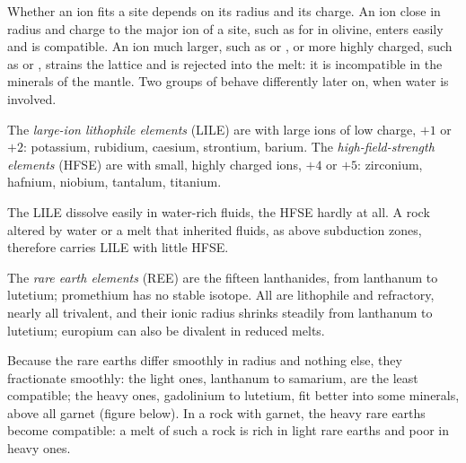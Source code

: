 Whether an ion fits a site depends on its radius and its charge. An ion close in
radius and charge to the major ion of a site, such as  for  in
olivine, enters easily and is compatible. An ion much larger, such as
 or , or more highly charged, such as  or
, strains the lattice and is rejected into the melt: it is
incompatible in the minerals of the mantle. Two groups of 
behave differently later on, when water is involved.

\begin{definition}
\label{def:b2:elements-in-the-earth:lile-hfse}
The \emph{large-ion lithophile elements}
(LILE) are  with large ions of low charge, $+1$ or $+2$:
potassium, rubidium, caesium, strontium, barium. The
\emph{high-field-strength elements} (HFSE)
are  with small, highly charged ions, $+4$ or $+5$:
zirconium, hafnium, niobium, tantalum, titanium.
\end{definition}

The LILE dissolve easily in water-rich fluids, the HFSE hardly at all. A rock
altered by water or a melt that inherited fluids, as above subduction zones,
therefore carries LILE with little HFSE.

\begin{definition}\label{def:b2:elements-in-the-earth:ree}
The \emph{rare earth elements} (REE) are the fifteen
lanthanides, from lanthanum to lutetium; promethium has no stable isotope. All
are lithophile and refractory, nearly all trivalent, and their ionic radius
shrinks steadily from lanthanum to lutetium; europium can also be divalent in
reduced melts.
\end{definition}

Because the rare earths differ smoothly in radius and nothing else, they
fractionate smoothly: the light ones, lanthanum to samarium, are the least
compatible; the heavy ones, gadolinium to lutetium, fit better into some
minerals, above all garnet (figure below). In a rock with garnet, the heavy rare
earths become compatible: a melt of such a rock is rich in light rare earths and
poor in heavy ones.

